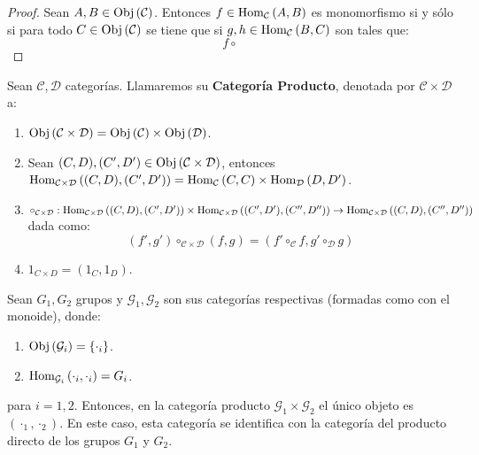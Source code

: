 \documentclass[12pt]{report}
\theoremstyle{largebreak}
\newcommand\cf[3]{\ensuremath{#1:#2\rightarrow#3}}
\newcommand{\Obj}[1]{\ensuremath{\textup{Obj}\left(#1\right)}}
\newcommand{\Hom}[3]{\ensuremath{\textup{Hom}_{#1}\left(#2,#3\right)}}
\begin{document}
    \begin{proof}
        Sean $A,B\in\Obj{\mathcal{C}}$. Entonces $f\in\Hom{\mathcal{C}}{A}{B}$ es monomorfismo si y sólo si para todo $C\in\Obj{\mathcal{C}}$ se tiene que si $g,h\in\Hom{\mathcal{C}}{B}{C}$ son tales que:
        \begin{equation*}
            f\circ 
        \end{equation*}
    \end{proof}

    \begin{mydef}
        Sean $\mathcal{C},\mathcal{D}$ categorías. Llamaremos su \textbf{Categoría Producto}, denotada por $\mathcal{C}\times\mathcal{D}$ a:
        \begin{enumerate}
            \item $\Obj{\mathcal{C}\times\mathcal{D}}=\Obj{\mathcal{C}}\times\Obj{\mathcal{D}}$.
            \item Sean $(C,D),(C',D')\in\Obj{\mathcal{C}\times\mathcal{D}}$, entonces $\Hom{\mathcal{C}\times\mathcal{D}}{(C,D)}{(C',D')}=\Hom{\mathcal{C}}{C}{C}\times\Hom{\mathcal{D}}{D}{D'}$.
            \item $\cf{\circ_{\mathcal{C}\times\mathcal{D}}}{\Hom{\mathcal{C}\times\mathcal{D}}{(C,D)}{(C',D')}\times\Hom{\mathcal{C}\times\mathcal{D}}{(C',D')}{(C'',D'')}}{\Hom{\mathcal{C}\times\mathcal{D}}{(C,D)}{(C'',D'')}}$ dada como:
            \begin{equation*}
                (f',g')\circ_{\mathcal{C}\times\mathcal{D}}(f,g)=(f'\circ_{\mathcal{C}} f,g'\circ_{\mathcal{D}} g)
            \end{equation*}
            \item $1_{C\times D}=(1_C,1_D)$.
        \end{enumerate}
    \end{mydef}

    \begin{exa}
        Sean $G_1,G_2$ grupos y $\mathcal{G}_1,\mathcal{G}_2$ son sus categorías respectivas (formadas como con el monoide), donde:
        \begin{enumerate}
            \item $\Obj{\mathcal{G}_i}=\left\{\cdot_i \right\}$.
            \item $\Hom{\mathcal{G}_i}{\cdot_i}{\cdot_i}=G_i$.
        \end{enumerate}
        para $i=1,2$. Entonces, en la categoría producto $\mathcal{G}_1\times\mathcal{G}_2$ el único objeto es $(\cdot_1,\cdot_2)$. En este caso, esta categoría se identifica con la categoría del producto directo de los grupos $G_1$ y $G_2$.
    \end{exa}
\end{document}

